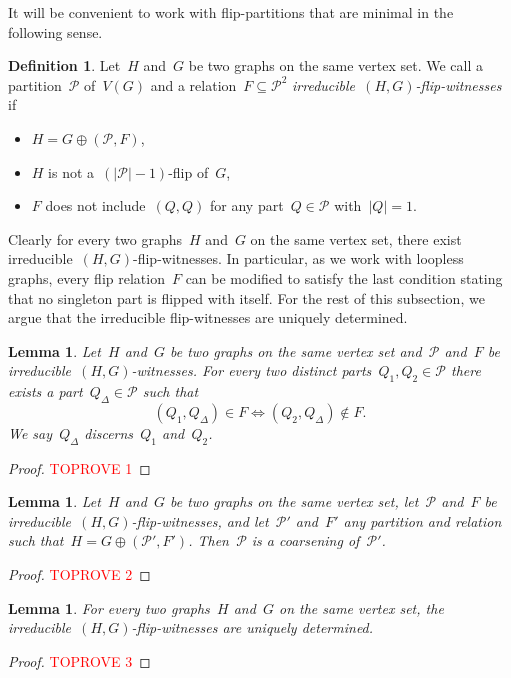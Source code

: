 \documentclass[11pt]{article}      \usepackage[margin=1in]{geometry}  \usepackage{microtype}
\newtheorem{lemma}[theorem]{Lemma}
\theoremstyle{definition}
\newtheorem{definition}[theorem]{Definition}
\newcommand{\PP}{\mathcal{P}}
\begin{document}
It will be convenient to work with flip-partitions that are minimal in the following sense.

\begin{definition}
    Let~$H$ and~$G$ be two graphs on the same vertex set.
    We call a partition~$\PP$ of~$V(G)$ and a relation~$F \subseteq \PP^2$  \emph{irreducible~$(H,G)$-flip-witnesses} if
    \begin{itemize}
        \item $H = G \oplus (\PP,F)$,
        \item $H$ is not a~$(|\PP|-1)$-flip of~$G$,
        \item $F$ does not include~$(Q,Q)$ for any part~$Q \in \PP$ with~$|Q| = 1$.
    \end{itemize}
\end{definition}

Clearly for every two graphs~$H$ and~$G$ on the same vertex set, there exist irreducible~$(H,G)$-flip-witnesses.
In particular, as we work with loopless graphs, every flip relation~$F$ can be modified to satisfy the last condition stating that no singleton part is flipped with itself.
For the rest of this subsection, we argue that the irreducible flip-witnesses are uniquely determined.

\begin{lemma}\label{lem:discerning-part}
    Let~$H$ and~$G$ be two graphs on the same vertex set and~$\PP$ and~$F$ be  irreducible~$(H,G)$-witnesses.
    For every two distinct parts~$Q_1,Q_2 \in \PP$ there exists a part~$Q_\Delta \in \PP$ such that
    \[
        (Q_1,Q_\Delta) \in F \Leftrightarrow  (Q_2,Q_\Delta) \notin F.
    \]
    We say~$Q_\Delta$ \emph{discerns}~$Q_1$ and~$Q_2$.
\end{lemma}
\begin{proof}\textcolor{red}{TOPROVE 1}\end{proof}



\begin{lemma}\label{lem:coarsening}
    Let~$H$ and~$G$ be two graphs on the same vertex set, let~$\PP$ and~$F$ be irreducible~$(H,G)$-flip-witnesses, and let~$\PP'$ and~$F'$ any partition and relation such that~$H = G \oplus (\PP',F')$.
    Then~$\PP$ is a coarsening of~$\PP'$.
\end{lemma}
\begin{proof}\textcolor{red}{TOPROVE 2}\end{proof}




\begin{lemma}\label{lem:irreducible-unique}
    For every two graphs~$H$ and~$G$ on the same vertex set, the irreducible~$(H,G)$-flip-witnesses are uniquely determined.
\end{lemma}
\begin{proof}\textcolor{red}{TOPROVE 3}\end{proof}
\end{document}
